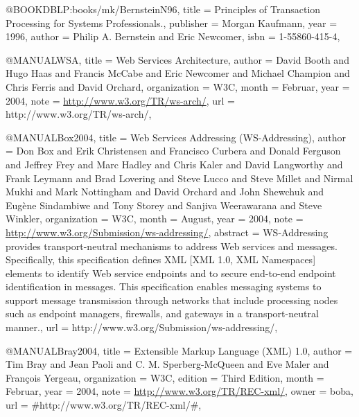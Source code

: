 @BOOK{DBLP:books/mk/BernsteinN96,
  title = {{Principles of Transaction Processing for Systems Professionals.}},
  publisher = {Morgan Kaufmann},
  year = {1996},
  author = {Philip A. Bernstein and Eric Newcomer},
  isbn = {1-55860-415-4},
}

@MANUAL{WSA,
  title = {{Web Services Architecture}},
  author = {David Booth and Hugo Haas and Francis McCabe and Eric Newcomer and
	Michael Champion and Chris Ferris and David Orchard},
  organization = {W3C},
  month = {Februar},
  year = {2004},
  note = {\url{http://www.w3.org/TR/ws-arch/}},
  url = {http://www.w3.org/TR/ws-arch/},
}

@MANUAL{Box2004,
  title = {{Web Services Addressing (WS-Addressing)}},
  author = {Don Box and Erik Christensen and Francisco Curbera and Donald Ferguson
	and Jeffrey Frey and Marc Hadley and Chris Kaler and David Langworthy
	and Frank Leymann and Brad Lovering and Steve Lucco and Steve Millet
	and Nirmal Mukhi and Mark Nottingham and David Orchard and John Shewchuk
	and Eugène Sindambiwe and Tony Storey and Sanjiva Weerawarana and
	Steve Winkler},
  organization = {W3C},
  month = {August},
  year = {2004},
  note = {\url{http://www.w3.org/Submission/ws-addressing/}},
  abstract = {WS-Addressing provides transport-neutral
mechanisms to address Web
	services and messages. Specifically, this
specification defines XML
	[XML 1.0, XML Namespaces] elements to identify Web
service endpoints
	and to secure end-to-end endpoint identification in
messages. This
	specification enables messaging systems to support message
transmission
	through networks that include processing nodes such as endpoint
managers,
	firewalls, and gateways in a transport-neutral manner.},
  url = {http://www.w3.org/Submission/ws-addressing/},
}

@MANUAL{Bray2004,
  title = {{Extensible Markup Language (XML) 1.0}},
  author = {Tim Bray and Jean Paoli and C. M. Sperberg-McQueen and Eve Maler
	and François Yergeau},
  organization = {W3C},
  edition = {Third Edition},
  month = {Februar},
  year = {2004},
  note = {\url{http://www.w3.org/TR/REC-xml/}},
  owner = {boba},
  url = {#http://www.w3.org/TR/REC-xml/#},
}


